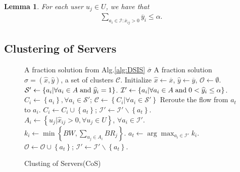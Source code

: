 \documentclass[journal]{IEEEtran}
\newtheorem{lemma}{Lemma}
\begin{document}
\begin{lemma}
	For each user $u_j \in U$, we have that
	\begin{eqnarray}
		\label{eq10}
		\sum\limits_{{a_i} \in \mathcal{I}:{{\overline x }_{ij}} > 0} {{{\overline y }_i}}  \le \alpha .
	\end{eqnarray}
\end{lemma}



\subsection{Clustering of Servers}
\begin{figure}[!t]
	\renewcommand{\algorithmicrequire}{\textbf{Input:}}
	\renewcommand{\algorithmicensure}{\textbf{Output:}}
	\begin{algorithm}[H]
		\caption{Clusting of Servers(CoS)}
		\begin{algorithmic}[1]\label{alg:CoS}
			\REQUIRE A fraction solution from Alg.\ref{alg:DSIS} $\overline{\sigma}$
			\ENSURE A fraction solution $\widehat \sigma = ({\widehat x},{\widehat y})$, a set of clusters $\mathcal{C}$.
			\STATE Initialize $\widehat x \leftarrow \overline x$, $\widehat y \leftarrow \overline y$, $\mathcal{O} \leftarrow \emptyset$.
			\STATE ${\mathcal{S}'} \leftarrow \left\{ {{a_i}|\forall{a_i} \in A\; {\rm{and}} \; {{\widehat y}_i} = 1} \right\}$.
			\STATE ${\mathcal{I}'} \leftarrow \left\{ {{a_i}|\forall{a_i} \in A\; {\rm{and}} \; 0<{{\widehat y}_i} \le \alpha} \right\}$.
			\STATE  $C_i \leftarrow \left\{a_i\right\}, \forall a_i \in \mathcal{S}'$; $\mathcal{C} \leftarrow \left\{C_i| \forall a_i\in \mathcal{S}'\right\}$
			\STATE Reroute the flow from $a_t$ to $a_i$.
			\STATE $C_i \leftarrow C_i \cup \left\{a_t\right\}$; $\mathcal{I}' \leftarrow \mathcal{I}' \backslash \left\{a_t\right\}$.
			\ENDIF
			\ENDFOR
			\STATE $A_i \leftarrow \left\{u_j| \widehat{x}_{ij} > 0, \forall u_j \in U \right\}$, $\forall a_i \in \mathcal{I}'$.
			\STATE $k_i \leftarrow \min \left\{BW, \sum\nolimits_{{u_j} \in A_i} {{BR_j}} \right\}$.
			\STATE $a_t \leftarrow \arg\max_{a_i \in \mathcal{I}'}{k_i}$.
			\STATE $\mathcal{O} \leftarrow  \mathcal{O} \cup \left\{a_t\right\}$; $\mathcal{I}' \leftarrow \mathcal{I}' \backslash \left\{a_t\right\}$.

\end{algorithmic}
\end{algorithm}
\end{figure}
\end{document}
